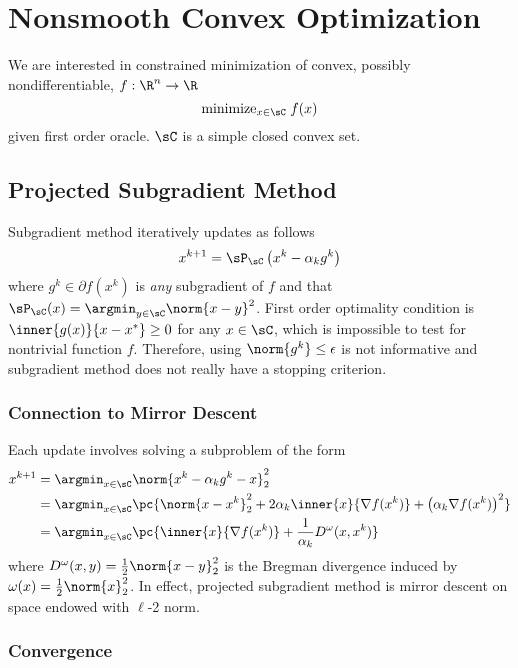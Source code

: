 \documentclass[../summary.tex]{subfiles}
\begin{document}
\section{Nonsmooth Convex Optimization}

We are interested in constrained minimization of convex, possibly nondifferentiable, $f:\R^n \to \R$ 
\[
    \text{minimize}_{x\in \sC}\; f(x)
\]
given first order oracle. $\sC$ is a simple closed convex set.

\subsection{Projected Subgradient Method}

Subgradient method iteratively updates as follows
\[
    x^{k+1}
        = \sP_{\sC}\left( x^k - \alpha_k g^k  \right)
\]
where $g^k \in\partial f(x^k)$ is \textit{any} subgradient of $f$ and that $\sP_{\sC}(x) = \argmin_{y\in\sC} \norm{x-y}^2$. First order optimality condition is $\inner{g(x)}{x-x^*} \geq 0$ for any $x\in\sC$, which is impossible to test for nontrivial function $f$. Therefore, using $\norm{g^k}\leq \epsilon$ is not informative and subgradient method does not really have a stopping criterion.

\subsubsection{Connection to Mirror Descent}

Each update involves solving a subproblem of the form
\begin{align*}
    x^{k+1}
        &= \argmin_{x\in\sC} \norm{ x^k - \alpha_k g^k - x }_2^2 \\
        &= \argmin_{x\in\sC} \pc{
            \norm{x-x^k}_2^2 + 2\alpha_k \inner{x}{\nabla f(x^k)} + \left( \alpha_k \nabla f(x^k) \right)^2
        } \\
        &= \argmin_{x\in\sC} \pc{
            \inner{x}{\nabla f(x^k)} + \frac{1}{\alpha_k} D^{\omega}(x,x^k)
        }
\end{align*} 
where $D^{\omega}(x,y) = \frac{1}{2}\norm{x-y}_2^2$ is the Bregman divergence induced by $\omega(x)=\frac{1}{2}\norm{x}_2^2$. In effect, projected subgradient method is mirror descent on space endowed with $\ell$-2 norm.

\subsubsection{Convergence}
\end{document}
